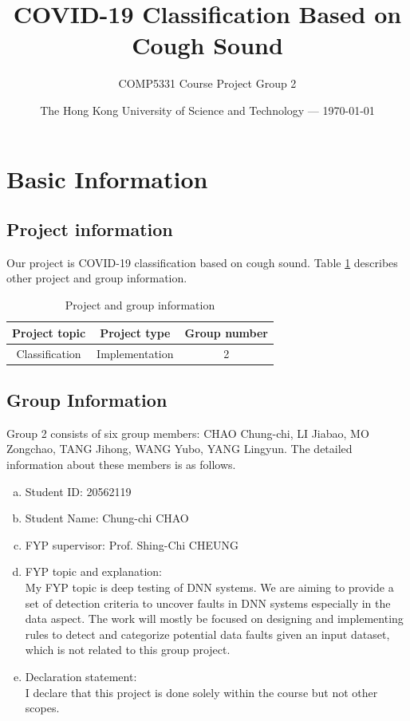 \documentclass[11pt]{article}
\title{COVID-19 Classification Based on Cough Sound} %
\author{COMP5331 Course Project Group 2} %
\date{The Hong Kong University of Science and Technology --- \today} %
\begin{document}
\maketitle %


\section{Basic Information}
\subsection{Project information}
Our project is COVID-19 classification based on cough sound. Table \ref{tab1} describes other project and group information.
\begin{table}[!htbp]
	\caption{Project and group information} \centering
	\label{tab1}
	\begin{tabular}{ccc}
	\toprule[1.5pt]
	Project topic & Project type & Group number \\
    \midrule[1pt]
    Classification & Implementation & 2 \\
	\bottomrule[1.5pt]
	\end{tabular}
\end{table}

\subsection{Group Information}
Group 2 consists of six group members: CHAO Chung-chi, LI Jiabao, MO Zongchao, TANG Jihong,
WANG Yubo, YANG Lingyun. The detailed information about these members is as
follows.

\begin{member}
	\begin{enumerate}[(a)]
		\item Student ID: 20562119
		\item Student Name: Chung-chi CHAO
		\item FYP supervisor: Prof. Shing-Chi CHEUNG
		\item FYP topic and explanation: \\
		My FYP topic is deep testing of DNN systems. We are aiming to provide a set of detection criteria to uncover faults in DNN systems especially in the data aspect. The work will mostly be focused on designing and implementing rules to detect and categorize potential data faults given an input dataset, which is not related to this group project.
		\item Declaration statement: \\
		I declare that this project is done solely within the course but not other scopes.
	\end{enumerate}
\end{member}
\end{document}
